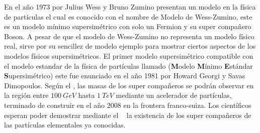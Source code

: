 
En el año 1973 por Julius Wess y Bruno Zumino presentan un modelo en la física de partículas el cual es conocido con el nombre de Modelo de Wess-Zumino, este es un modelo mínimo supersimétrico con solo un Fermion y su super compañero Boson. A pesar de que el modelo de
Wess-Zumino no representa un modelo físico real, sirve por su sencillez de modelo ejemplo para mostrar ciertos aspectos de los modelos físicos supersimétricos. El primer modelo supersimétrico compatible con el modelo estandar de la física de partículas llamado \MSSM(\textbf{M}odelo \textbf{M}ínimo \textbf{E}stándar \textbf{S}upersimétrico) este fue enunciado en el año 1981 por Howard Georgi y Savas Dimopoulos. Según el \MSSM, las masas de los super compañeros se podrán observar en la región entre $100~GeV$ hasta $1~TeV$ mediante un acelerador de partículas, terminado de construir en el año 2008 en la frontera
franco-suiza. Los científicos esperan poder demostrar mediante el \LHC~ la existencia de los super compañeros de las partículas elementales ya conocidas.
